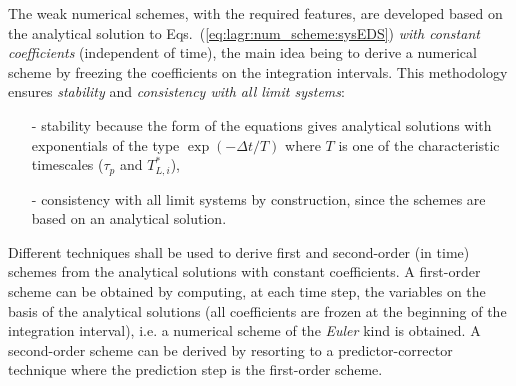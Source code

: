 The weak numerical schemes, with the required features, are developed based on the analytical solution to Eqs.~(\ref{eq:lagr:num_scheme:sysEDS}) {\it with constant coefficients} (independent of time), the main idea being to derive a numerical scheme by freezing the coefficients on the integration intervals. This methodology ensures \textit{stability} and \textit{consistency with all limit systems}:
\begin{enumerate}
\item[-] stability because the form of the equations gives analytical solutions with exponentials of the type $\exp(-\Delta t/T)$ where $T$ is one of the characteristic timescales ($\tau_p$ and $T_{L,i}^*$),
\item[-] consistency with all limit systems by construction, since the schemes are based on an analytical solution.
\end{enumerate}
Different techniques shall be used to derive first and second-order (in time) schemes from the analytical solutions with constant coefficients. A first-order scheme can be obtained by computing, at each time step, the variables on the basis of the analytical solutions (all coefficients are frozen at the beginning of the integration interval), i.e. a numerical scheme of the {\it Euler} kind is obtained. A second-order scheme can be derived by resorting to a predictor-corrector technique where the prediction step is the first-order scheme.

